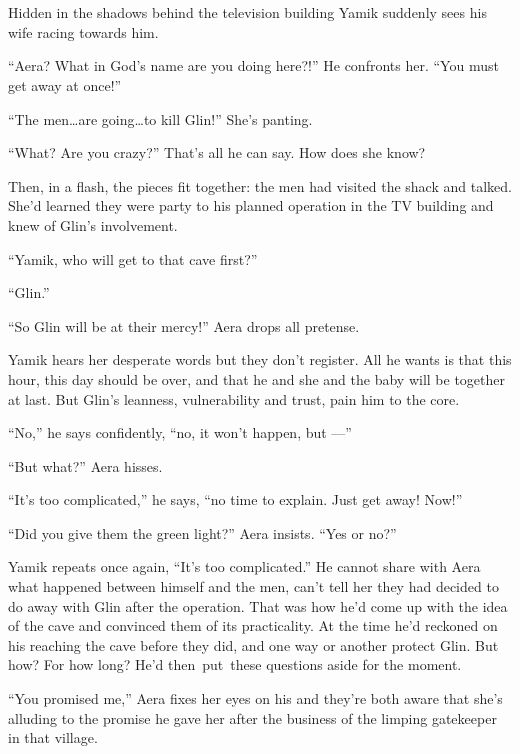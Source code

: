 \documentclass[twoside,11pt]{book}
\begin{document}
\chapter{}

Hidden in the shadows behind the television building Yamik suddenly sees his wife racing towards him.

``Aera? What in God's name are you doing here?!'' He confronts her. ``You must get away at
once!''

``The men{\ldots}are going{\ldots}to kill Glin!'' She's panting.

``What?{ }Are you crazy?'' That's all he can
say.  How does she know?

Then, in a flash, the pieces fit together: the men had visited the shack and talked. She'd learned they were party to
his planned operation in the TV building and knew of Glin's involvement.

``Yamik, who will get to that cave first?''

``Glin.''

``So Glin will be at their mercy!'' Aera drops all pretense.

Yamik hears her desperate words but they don't register. All he wants is that this hour, this day should be over, and
that he and she and the baby will be together at last. But Glin's leanness, vulnerability and trust, pain him to the
core{.}

 ``No,'' he says{ }confidently,
``no, it won't happen, but ---''

``But what?'' Aera hisses.

``It's too complicated,'' he says, ``no time to explain. Just get away!
Now!''

``Did you give them the green light?'' Aera insists. ``Yes or no?''

Yamik repeats once again, ``It's too complicated.'' He
cannot{ }share with Aera what happened between himself and the men, can't tell
her they had decided to do away with Glin after the operation. That was how he'd come up with the idea of the cave and
convinced them of its practicality.  At the time he'd reckoned on his reaching the cave before they did, and one way
or another protect Glin. But how? For how long? He'd then~put~these questions aside for the moment.

``You promised me,'' Aera fixes her eyes on his and they're both aware that she's alluding to
the promise he gave her after the business of the limping gatekeeper in that village.
\end{document}

